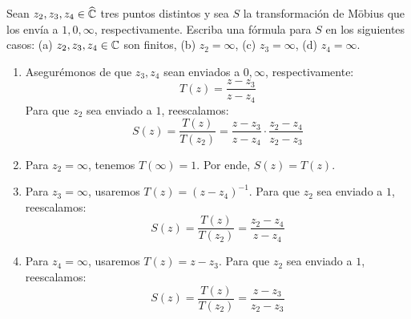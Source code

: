 \begin{exercise}
Sean $z_2, z_3, z_4 \in \widehat {\mathbb C}$ tres puntos distintos y sea $S$ la transformación de Möbius que los envía a $1, 0, \infty$, respectivamente. Escriba una fórmula para $S$ en los siguientes casos: (a) $z_2, z_3, z_4 \in \mathbb C$ son finitos, (b) $z_2 = \infty$, (c) $z_3 = \infty$, (d) $z_4 = \infty$.
\end{exercise}

\begin{solution}
\leavevmode
\begin{enumerate}[label=(\alph*)]
    \item Asegurémonos de que $z_3, z_4$ sean enviados a $0, \infty$, respectivamente:
    $$T(z) = \frac {z - z_3} {z - z_4}$$
    Para que $z_2$ sea enviado a $1$, reescalamos:
    $$S(z) = \frac {T(z)} {T(z_2)} = \frac {z - z_3} {z - z_4} \cdot \frac {z_2 - z_4} {z_2 - z_3}$$
    
    \item Para $z_2 = \infty$, tenemos $T(\infty) = 1$. Por ende, $S(z) = T(z)$.
    
    \item Para $z_3 = \infty$, usaremos $T(z) = (z - z_4)^{-1}$. Para que $z_2$ sea enviado a $1$, reescalamos:
    $$S(z) = \frac {T(z)} {T(z_2)} = \frac {z_2 - z_4} {z - z_4}$$
    
    \item Para $z_4 = \infty$, usaremos $T(z) = z - z_3$. Para que $z_2$ sea enviado a $1$, reescalamos:
    $$S(z) = \frac {T(z)} {T(z_2)} = \frac {z - z_3} {z_2 - z_3}$$
\end{enumerate}
\end{solution}
